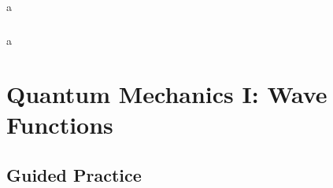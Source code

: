\documentclass{article}
\begin{document}
a

\setcounter{subsubsection}{90}
\subsubsection{}

a

\section{Quantum Mechanics I: Wave Functions}

\subsection{Guided Practice}

\subsubsection{}
\end{document}
